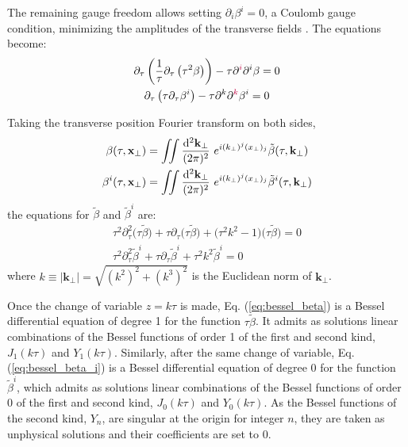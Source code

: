 The remaining gauge freedom allows setting $\partial_i \beta^i = 0$, a Coulomb gauge condition, minimizing the amplitudes of the transverse fields \cite{Blaizot:2010kh}. The equations become:
\begin{subequations}
\begin{gather}
	\partial_\tau \left( \frac{1}{\tau} \partial_\tau \left( \tau^2 \beta \right) \right) - \tau \partial^{\textcolor{purple}{i}}  \partial^i \beta = 0 \\
	\partial_\tau \left( \tau \partial_\tau \beta^i \right) - \tau \partial^k \partial^{\textcolor{purple}{k}} \beta^i =0
\end{gather}
\end{subequations}

Taking the transverse position Fourier transform on both sides,
\begin{subequations}
\begin{gather}
	\beta (\tau, \mathbf{x}_\perp) = \iint \frac{\mathop{}\!\mathrm{d}^2 \mathbf{k}_\perp}{(2\pi)^2} ~ e^{i (k_\perp)^j (x_\perp)_j} \tilde{\beta} (\tau, \mathbf{k}_\perp) \\
	\beta^i (\tau, \mathbf{x}_\perp) = \iint \frac{\mathop{}\!\mathrm{d}^2 \mathbf{k}_\perp}{(2\pi)^2} ~ e^{i (k_\perp)^j (x_\perp)_j} \tilde{\beta}^i (\tau, \mathbf{k}_\perp)
\end{gather}
\end{subequations}
the equations for $\tilde{\beta}$ and $\tilde{\beta}^i$ are:
\begin{subequations}
\begin{gather}
	\tau^2 \partial_\tau^2 \big(\tau \tilde{\beta}\big) + \tau \partial_\tau \big(\tau \tilde{\beta}\big) + \big(\tau^2 k^2 - 1\big) \big(\tau \tilde{\beta}\big) = 0  \label{eq:bessel_beta}\\ 
	\tau^2 \partial_\tau^2 \tilde{\beta}^i + \tau \partial_\tau \tilde{\beta}^i + \tau^2 k^2  \tilde{\beta}^i =0 \label{eq:bessel_beta_i}
\end{gather}
\end{subequations}
where $k\equiv |\mathbf{k}_\perp| = \sqrt{(k^2)^2+(k^3)^2}$ is the Euclidean norm of $\mathbf{k}_\perp$.


Once the change of variable $z= k \tau$ is made, Eq. (\ref{eq:bessel_beta}) is a Bessel differential equation of degree 1 for the function $\tau \tilde{\beta}$. It admits as solutions linear combinations of the Bessel functions of order 1 of the first and second kind, $J_1(k \tau)$ and $Y_1(k \tau)$. Similarly, after the same change of variable, Eq. (\ref{eq:bessel_beta_i}) is a Bessel differential equation of degree 0 for the function $\tilde{\beta}^i$, which admits as solutions linear combinations of the Bessel functions of order 0 of the first and second kind, $J_0(k \tau)$ and $Y_0(k \tau)$. \cite{arfken2005mathematical} As the Bessel functions of the second kind, $Y_n$, are singular at the origin for integer $n$, they are taken as unphysical solutions and their coefficients are set to $0$. 

